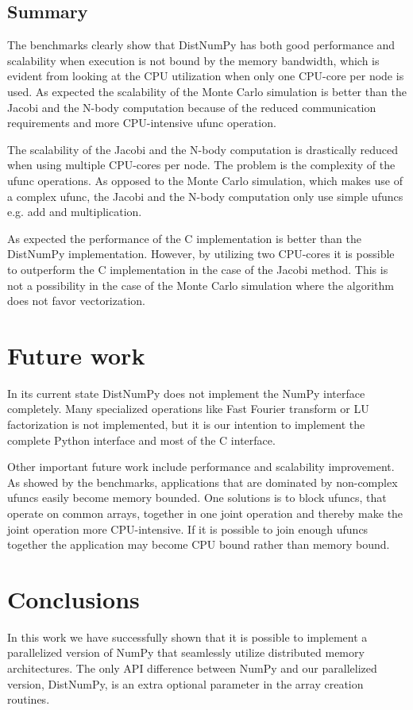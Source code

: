 \documentclass{sigplanconf}
\begin{document}
\subsection{Summary}
The benchmarks clearly show that DistNumPy has both good performance and scalability when execution is not bound by the memory bandwidth, which is evident from looking at the CPU utilization when only one CPU-core per node is used. As expected the scalability of the Monte Carlo simulation is better than the Jacobi and the N-body computation because of the reduced communication requirements and more CPU-intensive ufunc operation. 

The scalability of the Jacobi and the N-body computation is drastically reduced when using multiple CPU-cores per node. The problem is the complexity of the ufunc operations. As opposed to the Monte Carlo simulation, which makes use of a complex ufunc, the Jacobi and the N-body computation only use simple ufuncs e.g. add and multiplication.

As expected the performance of the C implementation is better than the DistNumPy implementation. However, by utilizing two CPU-cores it is possible to outperform the C implementation in the case of the Jacobi method. This is not a possibility in the case of the Monte Carlo simulation where the algorithm does not favor vectorization.

\section{Future work}
In its current state DistNumPy does not implement the NumPy interface completely. Many specialized operations like Fast Fourier transform or LU factorization is not implemented, but it is our intention to implement the complete Python interface and most of the C interface.

Other important future work include performance and scalability improvement. As showed by the benchmarks, applications that are dominated by non-complex ufuncs easily become memory bounded. One solutions is to block ufuncs, that operate on common arrays, together in one joint operation and thereby make the joint operation more CPU-intensive. If it is possible to join enough ufuncs together the application may become CPU bound rather than memory bound.

\section{Conclusions}
In this work we have successfully shown that it is possible to implement a parallelized version of NumPy\cite{numpy} that seamlessly utilize distributed memory architectures. The only API difference between NumPy and our parallelized version, DistNumPy, is an extra optional parameter in the array creation routines.
\end{document}
